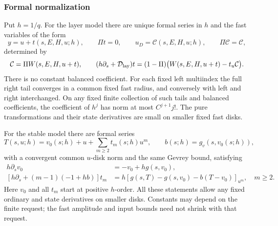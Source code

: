\subsubsection{Formal normalization}

\begin{lemma}\label{lem:regular-formal}
Put $h=1/q$.
For the layer model there are unique formal series in $h$ and the fast
variables of the form
\[
 y=u+t(s,E,H,u;h),\qquad \Pi t=0,\qquad
 u_D=\mathcal C(s,E,H,u;h),\qquad \Pi\mathcal C=\mathcal C,
\]
determined by
\begin{equation}\label{eq:regular-layer-normalization}
 \mathcal C=\Pi W(s,E,H,u+t),\qquad
 (h\partial_s+\mathcal D_{\rm lay})t=(1-\Pi)
       \bigl(W(s,E,H,u+t)-t_u\mathcal C\bigr).
\end{equation}
There is no constant balanced coefficient.  For each fixed left
multiindex the full right tail converges in a common fixed fast radius,
and conversely with left and right interchanged.  On any fixed finite
collection of such tails and balanced coefficients, the coefficient of
$h^j$ has norm at most $C^{j+1}j!$.  The pure transformations and their
state derivatives are small on smaller fixed fast disks.

For the stable model there are formal series
\[
 T(s,u;h)=v_0(s;h)+u+\sum_{m\ge2}t_m(s;h)u^m,
 \qquad b(s;h)=g_v(s,v_0(s;h)),
\]
with a convergent common $u$-disk norm and the same Gevrey bound,
satisfying
\begin{align}
 h\partial_sv_0&=-v_0+hg(s,v_0),\label{eq:regular-graph}\\
 [h\partial_s+(m-1)(-1+hb)]t_m
  &=h[g(s,T)-g(s,v_0)-b(T-v_0)]_{u^m},\quad m\ge2.
 \label{eq:regular-fiber}
\end{align}
Here $v_0$ and all $t_m$ start at positive $h$-order.  All these
statements allow any fixed ordinary and state derivatives on smaller
disks.  Constants may depend on the finite request; the fast amplitude
and input bounds need not shrink with that request.
\end{lemma}

